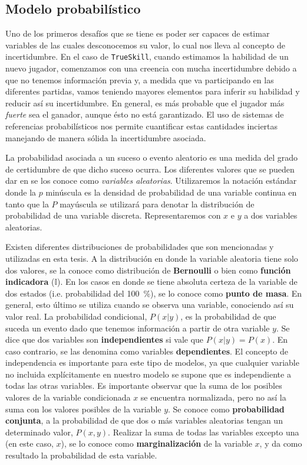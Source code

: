 \documentclass[11pt,twoside,spanish]{report} %
\begin{document}
\subsection{Modelo probabil\'istico}\label{Sec:ModeloProbalistico}

Uno de los primeros desaf\'ios que se tiene es poder ser capaces de estimar variables de las cuales desconocemos su valor, lo cual nos lleva al concepto de incertidumbre.
En el caso de \texttt{TrueSkill}, cuando estimamos la habilidad de un nuevo jugador, comenzamos con una creencia con mucha incertidumbre debido a que no tenemos informaci\'on previa y, a medida que va participando en las diferentes partidas, vamos teniendo mayores elementos para inferir su habilidad y reducir as\'i su incertidumbre.
En general, es m\'as probable que el jugador m\'as \emph{fuerte} sea el ganador, aunque \'esto no est\'a garantizado.
El uso de sistemas de referencias probabil\'isticos nos permite cuantificar estas cantidades inciertas manejando de manera s\'olida la incertidumbre asociada.

La probabilidad asociada a un suceso o evento aleatorio es una medida del grado de certidumbre de que dicho suceso ocurra.
Los diferentes valores que se pueden dar en se los conoce como \emph{variables aleatorias}.
Utilizaremos la notaci\'on est\'andar donde la $p$ min\'uscula es la densidad de probabilidad de una variable continua en tanto que la $P$ may\'uscula se utilizar\'a para denotar la distribuci\'on de probabilidad de una variable discreta.
Representaremos con $x$ e $y$ a dos variables aleatorias.

Existen diferentes distribuciones de probabilidades que son mencionadas y utilizadas en esta tesis.
A la distribuci\'on en donde la variable aleatoria tiene solo dos valores, se la conoce como distribuci\'on de \textbf{Bernoulli} o bien como \textbf{funci\'on indicadora} ($\mathbb{I}$).
En los casos en donde se tiene absoluta certeza de la variable de dos estados (i.e. probabilidad del \SI{100}{\percent}), se lo conoce como \textbf{punto de masa}.
En general, esto \'ultimo se utiliza cuando se observa una variable, conociendo as\'i su valor real.
La probabilidad condicional, $P(x|y)$, es la probabilidad de que suceda un evento dado que tenemos informaci\'on a partir de otra variable $y$.
Se dice que dos variables son \textbf{independientes} si vale que $P(x|y) = P(x)$.
En caso contrario, se las denomina como variables \textbf{dependientes}.
El concepto de independencia es importante para este tipo de modelos, ya que cualquier variable no incluida expl\'icitamente en nuestro modelo se supone que es independiente a todas las otras variables.
Es importante observar que la suma de los posibles valores de la variable condicionada $x$ se encuentra normalizada, pero no as\'i la suma con los valores posibles de la variable $y$.
Se conoce como \textbf{probabilidad conjunta}, a la probabilidad de que dos o m\'as variables aleatorias tengan un determinado valor, $P(x,y)$.
Realizar la suma de todas las variables excepto una (en este caso, $x$), se lo conoce como \textbf{marginalizaci\'on} de la variable $x$, y da como resultado la probabilidad de esta variable.
\end{document}
